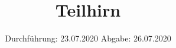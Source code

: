 

\subject{TPS Praktikum}
\title{Teilhirn}
\date{%
  Durchführung: 23.07.2020
  \hspace{3em}
  Abgabe: 26.07.2020
}



\maketitle
\thispagestyle{empty}
\tableofcontents
\newpage






\newpage

\printbibliography{}
\nocite{*}


